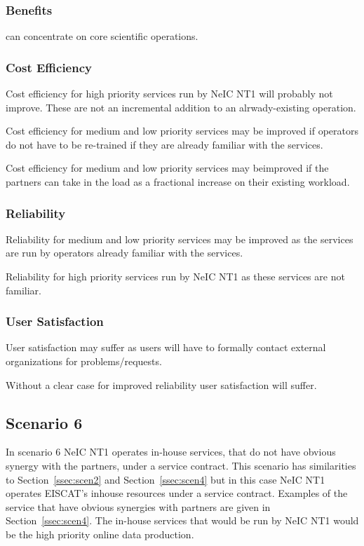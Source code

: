 \documentclass[12pt,a4paper]{article}
\newcommand{\nnt}{NeIC NT1\xspace}
\begin{document}
\subsubsection*{Benefits}
\bitm
\item \EC can concentrate on core scientific operations.
\eitm

\subsubsection*{Cost Efficiency}
\bitm
\item Cost efficiency for high priority services run by \nnt will probably not improve.
  These are not an incremental addition to an alrwady-existing operation.
  \item Cost efficiency for medium and low priority services may be improved if operators do not have to be re-trained if they are already familiar with the services.
  \item Cost efficiency for medium and low priority services may beimproved if the partners can take in the \ED load as a fractional increase on their existing workload.
\eitm

\subsubsection*{Reliability}
\bitm
  \item Reliability for medium and low priority services may be improved as the services are run by operators already familiar with the services.
  \item Reliability for high priority services run by \nnt as these services are not familiar.
\eitm

\subsubsection*{User Satisfaction}
\bitm
\item User satisfaction may suffer as \EC users will have to formally contact external organizations for problems/requests.
  \item Without a clear case for improved reliability user satisfaction will suffer.
\eitm

\subsection{Scenario 6}
\label{ssec:scen6}

In scenario 6 \nnt operates  in-house services, that do not have obvious synergy with the \EC partners,
under a service contract.
This scenario has similarities to Section~\ref{ssec:scen2} and Section~\ref{ssec:scen4} but
in this case \nnt operates EISCAT's inhouse resources under a service contract.
Examples of the \ED service that have obvious synergies with partners are given in Section~\ref{ssec:scen4}.
The in-house \ED services that would be run by \nnt would be the high priority online data production.
\end{document}

